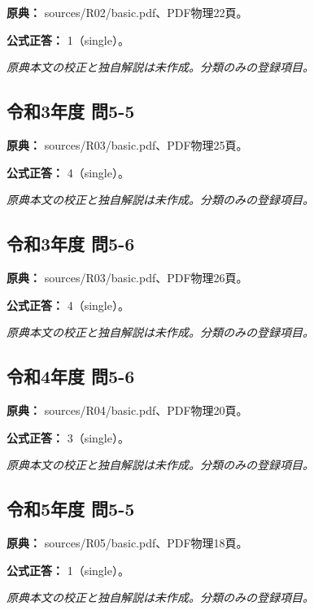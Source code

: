 \noindent\textbf{原典：} sources/R02/basic.pdf、PDF物理22頁。

\textbf{公式正答：} 1（single）。

\par\textit{原典本文の校正と独自解説は未作成。分類のみの登録項目。}

\subsection{令和3年度 問5-5}
\label{q:r03-reg-basic-5-5}

\noindent\textbf{原典：} sources/R03/basic.pdf、PDF物理25頁。

\textbf{公式正答：} 4（single）。

\par\textit{原典本文の校正と独自解説は未作成。分類のみの登録項目。}

\subsection{令和3年度 問5-6}
\label{q:r03-reg-basic-5-6}

\noindent\textbf{原典：} sources/R03/basic.pdf、PDF物理26頁。

\textbf{公式正答：} 4（single）。

\par\textit{原典本文の校正と独自解説は未作成。分類のみの登録項目。}

\subsection{令和4年度 問5-6}
\label{q:r04-reg-basic-5-6}

\noindent\textbf{原典：} sources/R04/basic.pdf、PDF物理20頁。

\textbf{公式正答：} 3（single）。

\par\textit{原典本文の校正と独自解説は未作成。分類のみの登録項目。}

\subsection{令和5年度 問5-5}
\label{q:r05-reg-basic-5-5}

\noindent\textbf{原典：} sources/R05/basic.pdf、PDF物理18頁。

\textbf{公式正答：} 1（single）。

\par\textit{原典本文の校正と独自解説は未作成。分類のみの登録項目。}

